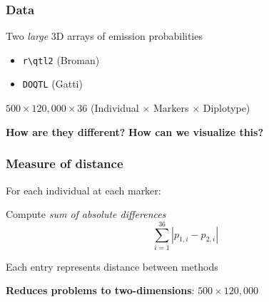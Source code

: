 \documentclass[12pt,t]{beamer}
\begin{document}
	\begin{frame}
		\frametitle{Data}
		\vspace{0.3in}
		Two \textit{large} 3D arrays of emission probabilities \\
		
		\vspace{0.25in}

		\begin{itemize}
			\item \texttt{r\textbackslash qtl2} (Broman)
			\item \texttt{DOQTL} (Gatti) \\
		\end{itemize}
		
		\vspace{0.25in}

		\pause $500 \times 120,000 \times 36$ \qquad (Individual $\times$ Markers $\times$ Diplotype)
		
		\vspace{0.25in}
		
		\pause \textbf{How are they different?}\newline
		\pause \textbf{How can we visualize this?}

	\end{frame}

	
	\begin{frame}
		\frametitle{Measure of distance}
		
		\vspace{0.3in}
		\pause For each individual at each marker: \newline
		
		Compute \textit{sum of absolute differences} 
		$$\sum_{i=1}^{36} |p_{1,i} - p_{2,i}|$$
		
		\pause Each entry represents distance between methods \newline
		
		\pause \textbf{Reduces problems to two-dimensions}: \pause $500 \times 120,000$ \newline
		
	\end{frame}
		
\end{document}

